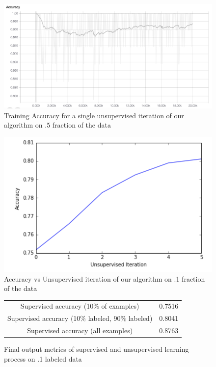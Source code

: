 \documentclass[11pt,letterpaper]{article}
\begin{document}
  \begin{figure}
	\includegraphics[scale = .24]{unsupervised-failed}
	\caption{Training Accuracy for a single unsupervised iteration of our algorithm on .5 fraction of the data}
\end{figure}


  \begin{figure}
	\includegraphics[scale = .5]{unsupervised_iter}
	\caption{Accuracy vs Unsupervised iteration of our algorithm on .1 fraction of the data}
\end{figure}

  \begin{figure}
	\begin{center}
\begin{tabular}{ |c|c| } 
 \hline
 Supervised accuracy (10\% of examples) & 0.7516 \\ 
 Supervised accuracy (10\% labeled, 90\% labeled) & 0.8041 \\ 
 Supervised accuracy (all examples) & 0.8763 \\ 
 \hline
\end{tabular}
\end{center}
	\caption{Final output metrics of supervised and unsupervised learning process on .1 labeled data}
\end{figure}
\end{document}
